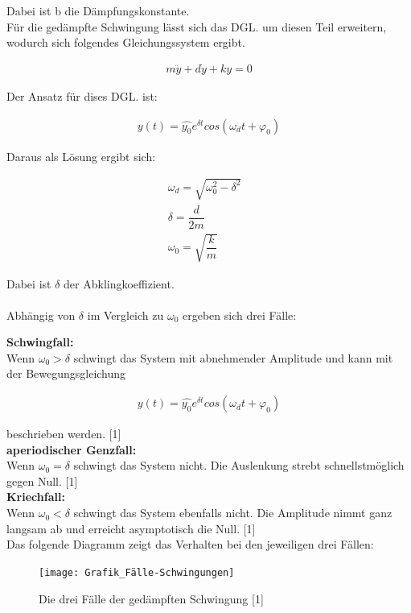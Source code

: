 \documentclass[a4paper]{scrartcl}
\numberwithin{equation}{subsection}
\begin{document}
Dabei ist b die Dämpfungskonstante. \\ 
Für die gedämpfte Schwingung lässt sich das DGL. um diesen Teil erweitern, wodurch sich folgendes Gleichungssystem ergibt.

\begin{align}
m \ddot{y} + d \dot{y} + k y = 0 
\end{align}

Der Ansatz für dises DGL. ist:

\begin{align}
y(t) = \widehat{y_0} e^{\delta t} cos(\omega_d t + \varphi_0)
\end{align}

Daraus als Lösung ergibt sich:

\begin{align}
\omega_d = \sqrt{\omega_0^2 - \delta^2} &\\
\delta = \dfrac{d}{2m} &\\
\omega_0 = \sqrt{\dfrac{k}{m}}
\end{align}

Dabei ist $\delta$ der Abklingkoeffizient. \\ \\

Abhängig von $\delta$ im Vergleich zu $\omega_0$ ergeben sich drei Fälle:

\textbf{Schwingfall:}\\
Wenn $\omega_0 > \delta$ schwingt das System mit abnehmender Amplitude und kann mit der Bewegungsgleichung

\begin{align}
y(t) = \widehat{y_0} e^{\delta t} cos(\omega_d t + \varphi_0)
\end{align}

beschrieben werden. [1]\\ 

\textbf{aperiodischer Genzfall:}\\
Wenn $\omega_0 = \delta$ schwingt das System nicht. Die Auslenkung strebt schnellstmöglich gegen Null. [1]\\

\textbf{Kriechfall:}\\
Wenn $\omega_0 < \delta$ schwingt das System ebenfalls nicht. Die Amplitude nimmt ganz langsam ab und erreicht asymptotisch die Null. [1]\\


Das folgende Diagramm zeigt das Verhalten bei den jeweiligen drei Fällen:

\begin{figure}[H]
\texttt{[image: Grafik\_Fälle-Schwingungen]}
\centering
\caption{Die drei Fälle der gedämpften Schwingung [1]}
\centering
\end{figure}
\end{document}
